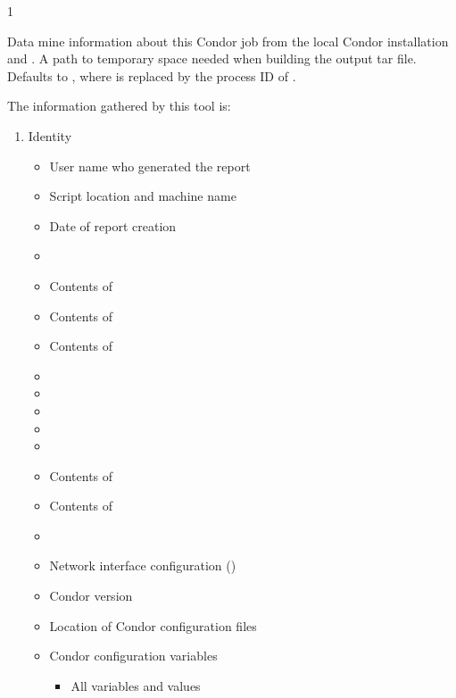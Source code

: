 \begin{ManPage}{\label{man-condor-gather-info}}{1}
\begin{Options}
  {Data mine information about this Condor job from the local 
  Condor installation and .}
  {A path to temporary space needed when building the output tar file.
  Defaults to , where  is replaced by
  the process ID of .}
\end{Options}

\GenRem

The information gathered by this tool is:

\begin{enumerate}
	\item Identity
	\begin{itemize}
          \item User name who generated the report
          \item Script location and machine name
          \item Date of report creation
          \item {}
          \item Contents of 
          \item Contents of 
          \item Contents of 
          \item {}
          \item {}
          \item {}
          \item {}
          \item {}
          \item Contents of 
          \item Contents of 
          \item {}
          \item Network interface configuration ()
          \item Condor version
          \item Location of Condor configuration files
          \item Condor configuration variables
		  \begin{itemize}
                \item All variables and values

\end{itemize}
\end{itemize}
\end{enumerate}
\end{ManPage}
